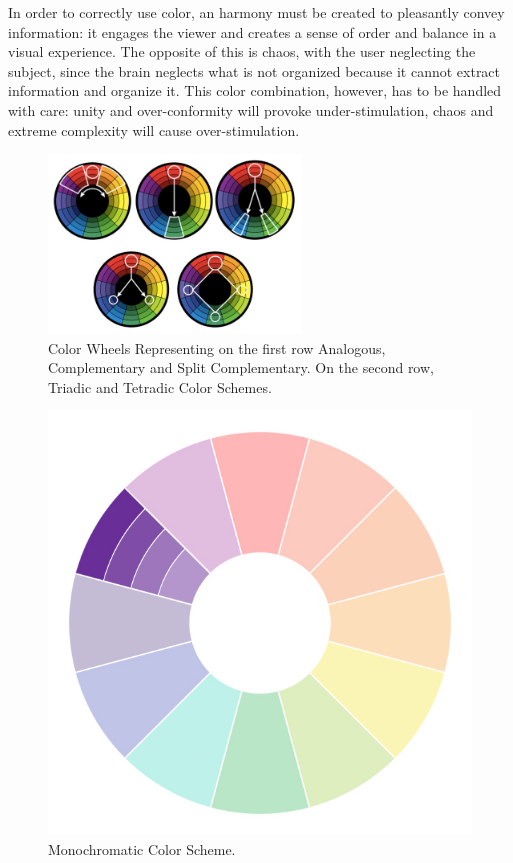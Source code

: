 %
In order to correctly use color, an harmony must be created to pleasantly convey information: it engages
the viewer and creates a sense of order and balance in a visual experience. The opposite of this is chaos,
with the user neglecting the subject, since the brain neglects what is not organized because it cannot
extract information and organize it. This color combination, however, has to be handled with care: unity
and over-conformity will provoke under-stimulation, chaos and extreme complexity will cause over-stimulation. \par
%
\begin{figure}[H]
	\centering
    \vspace{-15pt}
    \includegraphics[width=0.6\textwidth]{images/background/SchemesTogether.jpg}
    \caption[Color Schemes Wheels]{Color Wheels Representing on the first row Analogous, Complementary and
    Split Complementary. On the second row, Triadic and Tetradic Color Schemes.\protect\footnotemark{}}
    \vspace{-15pt}
    \label{fig:wheels}
\end{figure}
%
\begin{figure}
  \centering
  \vspace{-1\baselineskip}
  \includegraphics[width=0.7\linewidth]{images/background/monochromatic.jpg}
  \caption[Monochromatic Color Scheme]{Monochromatic Color Scheme.\protect\footnotemark{}}
  \label{fig:monochromatic}
\end{figure}
